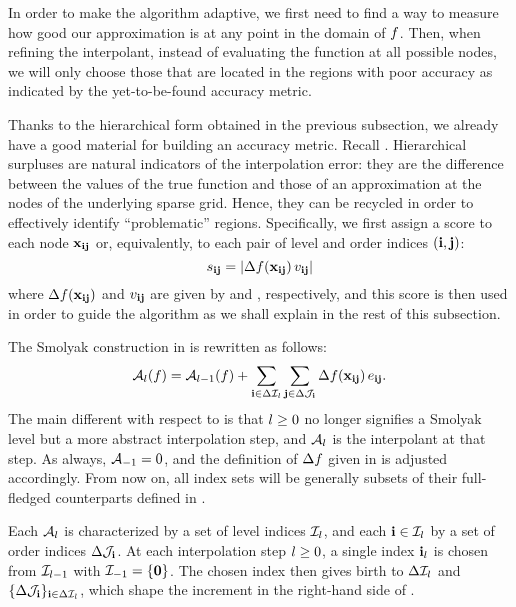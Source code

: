 In order to make the algorithm adaptive, we first need to find a way to measure
how good our approximation is at any point in the domain of $f$. Then, when
refining the interpolant, instead of evaluating the function at all possible
nodes, we will only choose those that are located in the regions with poor
accuracy as indicated by the yet-to-be-found accuracy metric.

Thanks to the hierarchical form obtained in the previous subsection, we already
have a good material for building an accuracy metric. Recall .
Hierarchical surpluses are natural indicators of the interpolation error: they
are the difference between the values of the true function and those of an
approximation at the nodes of the underlying sparse grid. Hence, they can be
recycled in order to effectively identify ``problematic'' regions. Specifically,
we first assign a score to each node $\mathbf{x}_{\mathbf{i}\mathbf{j}}$ or, equivalently, to each
pair of level and order indices $(\mathbf{i}, \mathbf{j})$:
\begin{equation} \elab{score}
  \score_{\vi\vj} = \left| \surplus(\vx_{\vi\vj}) \, \w_{\vi\vj} \right|
\end{equation}
where $\Delta f(\mathbf{x}_{\mathbf{i}\mathbf{j}})$ and $v_{\mathbf{i}\mathbf{j}}$ are given by  and
, respectively, and this score is then used in order to guide the
algorithm as we shall explain in the rest of this subsection.

The Smolyak construction in  is rewritten as follows:
\begin{equation} \elab{approximation}
  \approximation{\l}(\f) = \approximation{\l-1}(\f) + \sum_{\vi \in \Delta\lindex_\l} \sum_{\vj \in \Delta\oindex_\vi} \surplus(\vx_{\vi\vj}) \,
\e_{\vi\vj}.
\end{equation}
The main different with respect to  is that $l \geq
0$ no longer signifies a Smolyak level but a more abstract interpolation step,
and $\mathcal{A}_{l}$ is the interpolant at that step. As always,
$\mathcal{A}_{-1} = 0$, and the definition of $\Delta f$ given in
 is adjusted accordingly. From now on, all index sets will be
generally subsets of their full-fledged counterparts defined in .

Each $\mathcal{A}_{l}$ is characterized by a set of level indices
$\mathcal{I}_l$, and each $\mathbf{i} \in \mathcal{I}_l$ by a set of order indices
$\Delta\mathcal{J}_{\mathbf{i}}$. At each interpolation step $l \geq 0$, a single index
$\mathbf{i}_l$ is chosen from $\mathcal{I}_{l-1}$ with $\mathcal{I}_{-1} = \{ \mathbf{0} \}$. The
chosen index then gives birth to $\Delta\mathcal{I}_l$ and $\{ \Delta\mathcal{J}_{\mathbf{i}}
\}_{\mathbf{i} \in \Delta\mathcal{I}_l}$, which shape the increment in the right-hand side
of .

